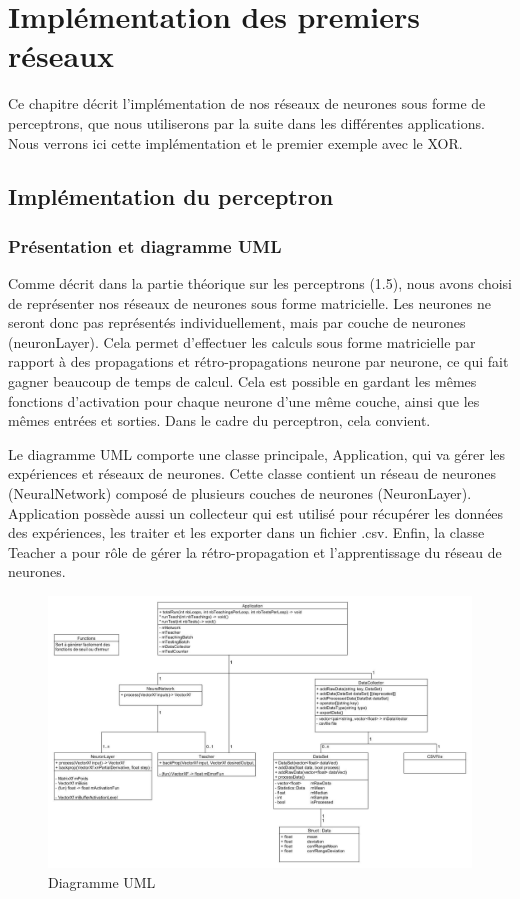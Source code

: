 \chapter{Implémentation des premiers réseaux}

Ce chapitre décrit l'implémentation de nos réseaux de neurones sous forme de perceptrons, que nous utiliserons par la suite dans les différentes applications. Nous verrons ici cette implémentation et le premier exemple avec le XOR.

\section{Implémentation du perceptron}

\subsection{Présentation et diagramme UML}

Comme décrit dans la partie théorique sur les perceptrons (1.5), nous avons choisi de représenter nos réseaux de neurones sous forme matricielle. Les neurones ne seront donc pas représentés individuellement, mais par couche de neurones (neuronLayer). Cela permet d'effectuer les calculs sous forme matricielle par rapport à des propagations et rétro-propagations neurone par neurone, ce qui fait gagner beaucoup de temps de calcul.
Cela est possible en gardant les mêmes fonctions d'activation pour chaque neurone d'une même couche, ainsi que les mêmes entrées et sorties. Dans le cadre du perceptron, cela convient.

Le diagramme UML comporte une classe principale, Application, qui va gérer les expériences et réseaux de neurones. Cette classe contient un réseau de neurones (NeuralNetwork) composé de plusieurs couches de neurones (NeuronLayer). Application possède aussi un collecteur qui est utilisé pour récupérer les données des expériences, les traiter et les exporter dans un fichier .csv. Enfin, la classe Teacher a pour rôle de gérer la rétro-propagation et l'apprentissage du réseau de neurones.

\newpage

\begin{figure}[h]
\begin{center}
\includegraphics[width=1\textwidth]{images/umlDiagram.jpg}\caption{Diagramme UML}
\end{center}
\end{figure} 

